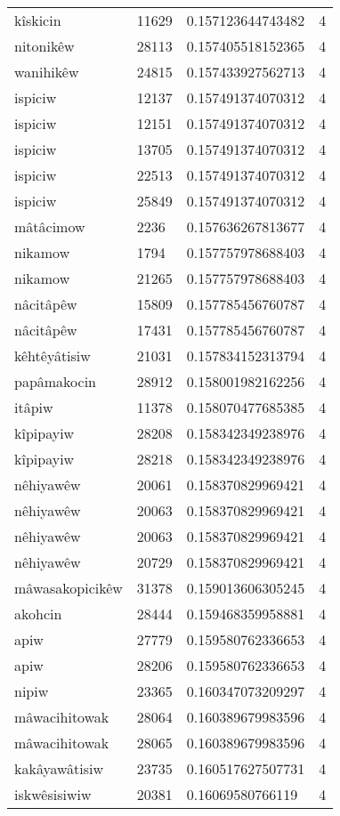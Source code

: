 \begin{longtable}{llll}
kîskicin & 11629 & 0.157123644743482 & 4 \\
nitonikêw & 28113 & 0.157405518152365 & 4 \\
wanihikêw & 24815 & 0.157433927562713 & 4 \\
ispiciw & 12137 & 0.157491374070312 & 4 \\
ispiciw & 12151 & 0.157491374070312 & 4 \\
ispiciw & 13705 & 0.157491374070312 & 4 \\
ispiciw & 22513 & 0.157491374070312 & 4 \\
ispiciw & 25849 & 0.157491374070312 & 4 \\
mâtâcimow & 2236 & 0.157636267813677 & 4 \\
nikamow & 1794 & 0.157757978688403 & 4 \\
nikamow & 21265 & 0.157757978688403 & 4 \\
nâcitâpêw & 15809 & 0.157785456760787 & 4 \\
nâcitâpêw & 17431 & 0.157785456760787 & 4 \\
kêhtêyâtisiw & 21031 & 0.157834152313794 & 4 \\
papâmakocin & 28912 & 0.158001982162256 & 4 \\
itâpiw & 11378 & 0.158070477685385 & 4 \\
kîpipayiw & 28208 & 0.158342349238976 & 4 \\
kîpipayiw & 28218 & 0.158342349238976 & 4 \\
nêhiyawêw & 20061 & 0.158370829969421 & 4 \\
nêhiyawêw & 20063 & 0.158370829969421 & 4 \\
nêhiyawêw & 20063 & 0.158370829969421 & 4 \\
nêhiyawêw & 20729 & 0.158370829969421 & 4 \\
mâwasakopicikêw & 31378 & 0.159013606305245 & 4 \\
akohcin & 28444 & 0.159468359958881 & 4 \\
apiw & 27779 & 0.159580762336653 & 4 \\
apiw & 28206 & 0.159580762336653 & 4 \\
nipiw & 23365 & 0.160347073209297 & 4 \\
mâwacihitowak & 28064 & 0.160389679983596 & 4 \\
mâwacihitowak & 28065 & 0.160389679983596 & 4 \\
kakâyawâtisiw & 23735 & 0.160517627507731 & 4 \\
iskwêsisiwiw & 20381 & 0.16069580766119 & 4 \\

\end{longtable}
